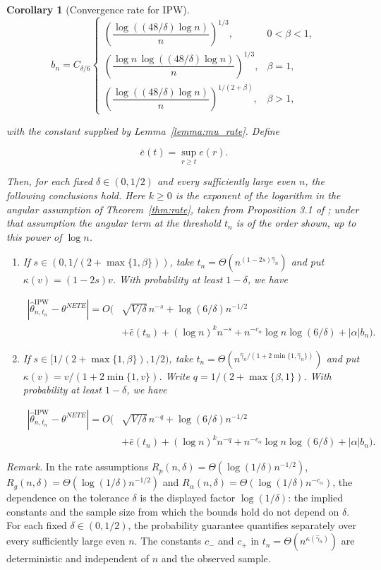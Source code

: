 \documentclass[12pt]{article}
\theoremstyle{plain}
\newtheorem{corollary}[theorem]{Corollary}
\theoremstyle{definition}
\begin{document}
\begin{corollary}[Convergence rate for IPW]
\[
b_n=C_{\delta/6}\begin{cases}
\left(\dfrac{\log((48/\delta)\log n)}{n}\right)^{1/3},&0<\beta<1,\\
\left(\dfrac{\log n\,\log((48/\delta)\log n)}{n}\right)^{1/3},&\beta=1,\\
\left(\dfrac{\log((48/\delta)\log n)}{n}\right)^{1/(2+\beta)},&\beta>1,
\end{cases}
\]

with the constant supplied by Lemma~\ref{lemma:mu_rate}. Define

\[
\bar e(t)=\sup_{r\geq t}e(r).
\]

Then, for each fixed $\delta\in(0,1/2)$ and every sufficiently large even $n$, the following conclusions hold. Here $k\geq0$ is the exponent of the logarithm in the angular assumption of Theorem~\ref{thm:rate}, taken from Proposition 3.1 of \citet{zhang2023wasserstein}; under that assumption the angular term at the threshold $t_n$ is of the order shown, up to this power of $\log n$.
\begin{enumerate}
    \item If $s\in(0,1/(2+\max\{1,\beta\}))$, take $t_n=\Theta(n^{(1-2s)\hat\gamma_n})$ and put $\kappa(v)=(1-2s)v$. With probability at least $1-\delta$, we have

\[
\begin{aligned}
|\widehat\theta_{n,t_n}^{\text{IPW}}-\theta^{NETE}|=O\bigl(&\sqrt{V/\delta}\,n^{-s}+\log(6/\delta)n^{-1/2}\\
&+\bar e(t_n)+(\log n)^k n^{-s}+n^{-c_\alpha}\log n\log(6/\delta)+|\alpha|b_n\bigr).
\end{aligned}
\]

    \item If $s\in[1/(2+\max\{1,\beta\}),1/2)$, take $t_n=\Theta(n^{\hat\gamma_n/(1+2\min\{1,\hat\gamma_n\})})$ and put $\kappa(v)=v/(1+2\min\{1,v\})$. Write $q=1/(2+\max\{\beta,1\})$. With probability at least $1-\delta$, we have

\[
\begin{aligned}
|\widehat\theta_{n,t_n}^{\text{IPW}}-\theta^{NETE}|=O\bigl(&\sqrt{V/\delta}\,n^{-q}+\log(6/\delta)n^{-1/2}\\
&+\bar e(t_n)+(\log n)^k n^{-q}+n^{-c_\alpha}\log n\log(6/\delta)+|\alpha|b_n\bigr).
\end{aligned}
\]

  \end{enumerate}
\end{corollary}

\noindent\textit{Remark.} In the rate assumptions $R_p(n,\delta)=\Theta(\log(1/\delta)n^{-1/2})$, $R_g(n,\delta)=\Theta(\log(1/\delta)n^{-1/2})$ and $R_\alpha(n,\delta)=\Theta(\log(1/\delta)n^{-c_\alpha})$, the dependence on the tolerance $\delta$ is the displayed factor $\log(1/\delta)$: the implied constants and the sample size from which the bounds hold do not depend on $\delta$. For each fixed $\delta\in(0,1/2)$, the probability guarantee quantifies separately over every sufficiently large even $n$. The constants $c_-$ and $c_+$ in $t_n=\Theta(n^{\kappa(\hat\gamma_n)})$ are deterministic and independent of $n$ and the observed sample.
\end{document}
